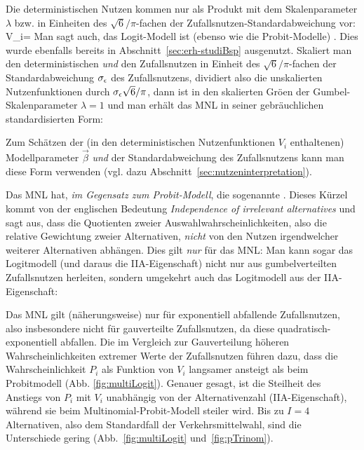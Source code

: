 \item Die deterministischen Nutzen kommen nur als Produkt mit dem
Skalenparameter $\lambda$ bzw. in Einheiten des $\sqrt{6}/\pi$-fachen
der Zufallsnutzen-Standardabweichung vor:
\be
\label{logit-skalierung}
\lambda V_i= 
\ee
Man sagt auch, das Logit-Modell ist (ebenso wie die
Probit-Modelle) . Dies wurde ebenfalls bereits
in  Abschnitt~\ref{sec:erh-studiBsp} ausgenutzt.
Skaliert man den
deterministischen \emph{und} den Zufallsnutzen in  Einheit des
$\sqrt{6}/\pi$-fachen der Standardabweichung $\sigma_{\epsilon}$ des
Zufallsnutzens, dividiert also die unskalierten Nutzenfunktionen durch
$\sigma_{\epsilon} \sqrt{6}/\pi$, dann ist in den skalierten Gr\"o\3en der
Gumbel-Skalenparameter $\lambda=1$ und man  erh\"alt das MNL in seiner
gebr\"auchlichen standardisierten Form: 

Zum Sch\"atzen der (in den deterministischen Nutzenfunktionen $V_i$
enthaltenen) Modellparameter $\vec{\beta}$ \emph{und} der
Standardabweichung des Zufallsnutzens kann man diese Form
verwenden (vgl. dazu 
Abschnitt~\ref{sec:nutzeninterpretation}).

\item Das MNL hat, \emph{im Gegensatz zum Probit-Modell},  die
sogenannte . Dieses K\"urzel kommt von der
englischen Bedeutung \textit{Independence of irrelevant alternatives}
und sagt aus, dass die Quotienten zweier Auswahlwahrscheinlichkeiten,
also die relative Gewichtung zweier Alternativen, \textit{nicht} von
den Nutzen irgendwelcher weiterer Alternativen abh\"angen. Dies gilt
\emph{nur} f\"ur das MNL:  Man kann sogar das Logitmodell
(und daraus die  IIA-Eigenschaft) 
nicht nur aus gumbelverteilten Zufallsnutzen herleiten, sondern
umgekehrt auch das
Logitmodell aus der
IIA-Eigenschaft:

\be
\label{IIAisMNL}
 \Longleftrightarrow {}
\ee


\item Das MNL gilt (n\"aherungsweise) nur f\"ur exponentiell abfallende
Zufallsnutzen, also insbesondere nicht f\"ur gau\3verteilte
Zufallsnutzen, da diese quadratisch-exponentiell abfallen. 
Die im Vergleich zur Gau\3verteilung h\"oheren
Wahrscheinlichkeiten extremer Werte der Zufallsnutzen f\"uhren dazu, dass die
Wahrscheinlichkeit $P_i$ als Funktion von $V_i$ langsamer ansteigt als
beim Probitmodell (Abb. \ref{fig:multiLogit}). Genauer gesagt, ist
die Steilheit des Anstiegs von $P_i$ mit $V_i$ unabh\"angig von der
Alternativenzahl (IIA-Eigenschaft), w\"ahrend sie beim
Multi\-no\-mi\-al-Probit-Modell steiler wird. Bis zu $I=4$
Alternativen, also dem Standardfall der Verkehrsmittelwahl, sind
die Unterschiede gering (Abb.~\ref{fig:multiLogit} und~\ref{fig:pTrinom}).
\ei

